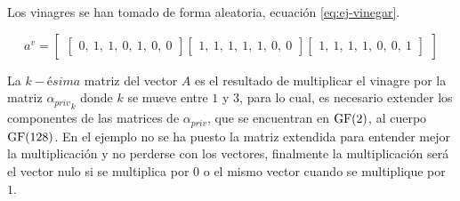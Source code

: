 Los vinagres se han tomado de forma aleatoria, ecuación \ref{eq:ej-vinegar}. 

\begin{equation}\label{eq:ej-vinegar}
{a^v} = \left[
	\begin{array}{c}
	\left[\begin{array}{c}
		0,\ 1,\ 1,\ 0,\ 1,\ 0,\ 0
	\end{array}\right]
	
	\left[\begin{array}{c}
		1,\ 1,\ 1,\ 1,\ 1,\ 0,\ 0
	\end{array}\right]
	
	\left[\begin{array}{c}
		1,\ 1,\ 1,\ 1,\ 0,\ 0,\ 1
	\end{array}\right]
	\end{array}
	\right]
\end{equation}

La $k-ésima$ matriz del vector $A$ es el resultado de multiplicar el vinagre por la matriz ${\alpha_{priv}}_k$ donde $k$ se mueve entre $1$ y $3$, para lo cual, es necesario extender los componentes de las matrices de $\alpha_{priv}$, que se encuentran en $\operatorname{GF}(2)$, al cuerpo $\operatorname{GF}(128)$. En el ejemplo no se ha puesto la matriz extendida para entender mejor la multiplicación y no perderse con los vectores, finalmente la multiplicación será el vector nulo si se multiplica por $0$ o el mismo vector cuando se multiplique por $1$.

